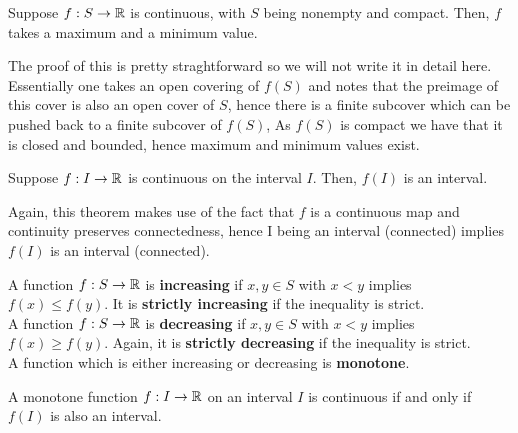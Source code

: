 \begin{theorem}
	Suppose \(f:S \to \mathbb{R}\) is continuous, with \(S\) being nonempty and compact. Then, \(f\) takes a maximum and a minimum value.
\end{theorem}
The proof of this is pretty straghtforward so we will not write it in detail here. Essentially one takes an open covering of \(f\left( S \right) \) and notes that the preimage of this cover is also an open cover of \(S\), hence there is a finite subcover which can be pushed back to a finite subcover of \(f\left( S \right) \), As \(f\left( S \right) \) is compact we have that it is closed and bounded, hence maximum and minimum values exist.
\begin{theorem}
	Suppose \(f: I \to \mathbb{R}\) is continuous on the interval \(I\). Then, \(f\left( I \right) \) is an interval.
\end{theorem}
Again, this theorem makes use of the fact that \(f\) is a continuous map and continuity preserves connectedness, hence I being an interval (connected) implies \(f\left( I \right) \) is an interval (connected).
\begin{definition}[Monotonicity]
	A function \(f: S \to \mathbb{R}\) is \textbf{increasing} if \(x, y \in S\) with \(x < y\) implies \(f\left( x \right)  \le f\left( y \right) \). It is \textbf{strictly increasing} if the inequality is strict.\\
	A function \(f: S \to \mathbb{R}\) is \textbf{decreasing} if \(x, y  \in S\) with \(x < y\) implies \(f\left( x \right) \ge f\left( y \right) \). Again, it is \textbf{strictly decreasing} if the inequality is strict.\\
	A function which is either increasing or decreasing is \textbf{monotone}.
\end{definition}
\begin{proposition}
	A monotone function \(f: I \to \mathbb{R}\) on an interval \(I\) is continuous if and only if \(f\left( I \right) \) is also an interval.
\end{proposition}
